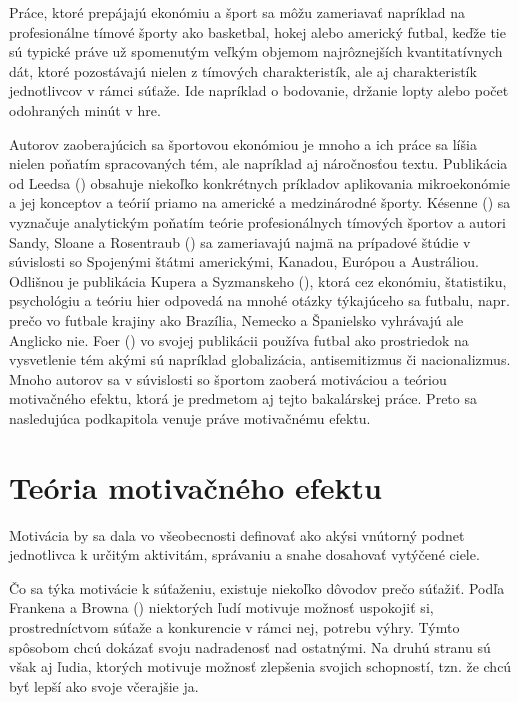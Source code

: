 \documentclass[
  digital, %
  twoside, %
  notable,   %
  lof,     %
  lot,     %
]{fithesis3}
\begin{document}
	Práce, ktoré prepájajú ekonómiu a šport sa môžu zameriavať napríklad na profesionálne tímové športy ako basketbal, hokej alebo americký futbal, keďže tie sú typické práve už spomenutým veľkým objemom najrôznejších kvantitatívnych dát, ktoré pozostávajú nielen z tímových charakteristík, ale aj charakteristík jednotlivcov v rámci súťaže. Ide napríklad o bodovanie, držanie lopty alebo počet odohraných minút v hre.
	
	Autorov zaoberajúcich sa športovou ekonómiou je mnoho a ich práce sa líšia nielen poňatím spracovaných tém, ale napríklad aj náročnosťou textu. Publikácia od Leedsa (\citeyear{leeds2018}) obsahuje niekoľko konkrétnych príkladov aplikovania mikroekonómie a jej konceptov a teórií priamo na americké a medzinárodné športy. Késenne (\citeyear{kesenne2014}) sa vyznačuje analytickým poňatím teórie profesionálnych tímových športov a autori Sandy, Sloane a Rosentraub (\citeyear{sandy2004}) sa zameriavajú najmä na prípadové štúdie v súvislosti so Spojenými štátmi americkými, Kanadou, Európou a Austráliou. Odlišnou je publikácia Kupera a Syzmanskeho (\citeyear{kuper2009}), ktorá cez ekonómiu, štatistiku, psychológiu a teóriu hier odpovedá na mnohé otázky týkajúceho sa futbalu, napr. prečo vo futbale krajiny ako Brazília, Nemecko a Španielsko vyhrávajú ale Anglicko nie. Foer (\citeyear{foer2004}) vo svojej publikácii používa futbal ako prostriedok na vysvetlenie tém akými sú napríklad globalizácia, antisemitizmus či nacionalizmus. Mnoho autorov sa v súvislosti so športom zaoberá motiváciou a teóriou motivačného efektu, ktorá je predmetom aj tejto bakalárskej práce. Preto sa nasledujúca podkapitola venuje práve motivačnému efektu.
	
		\section{Teória motivačného efektu}
		Motivácia by sa dala vo všeobecnosti definovať ako akýsi vnútorný podnet jednotlivca k určitým aktivitám, správaniu a snahe dosahovať vytýčené ciele. 
		
		Čo sa týka motivácie k súťaženiu, existuje niekoľko dôvodov prečo súťažiť. Podľa Frankena a Browna (\citeyear[s.~176]{franken1995}) niektorých ľudí motivuje možnosť uspokojiť si, prostredníctvom súťaže a konkurencie v rámci nej, potrebu výhry. Týmto spôsobom chcú dokázať svoju nadradenosť nad ostatnými. \parencite{nicholls1989} Na druhú stranu sú však aj ľudia, ktorých motivuje možnosť zlepšenia svojich schopností, tzn. že chcú byť lepší ako svoje včerajšie ja.
		
\end{document}
